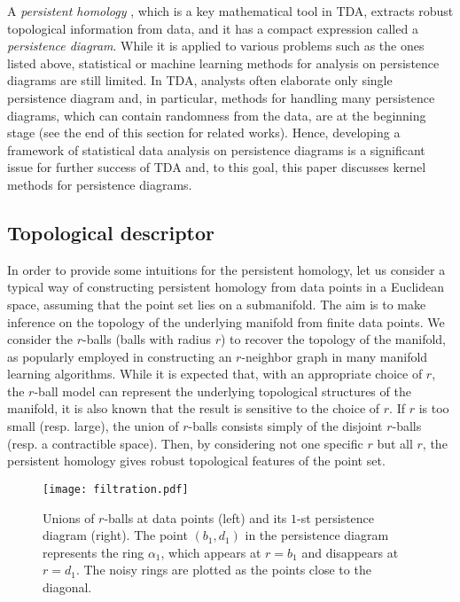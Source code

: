 \documentclass{article}
\begin{document}
A {\em persistent homology} \cite{ELZ02}, which is a key mathematical tool in TDA, extracts robust topological information from data, and it has a compact expression called a {\em persistence diagram}.
While it is applied to various problems such as the ones listed above, statistical or machine learning methods for analysis on persistence diagrams are still limited.
In TDA, analysts often elaborate only single persistence diagram and, in particular, methods for handling many persistence diagrams, which can contain randomness from the data, are at the beginning stage (see the end of this section for related works).
Hence, developing a framework of statistical data analysis on persistence diagrams is a significant issue for further success of TDA and, to this goal, this paper discusses kernel methods for persistence diagrams.

\subsection{Topological descriptor}
\label{subsec:persistent_homology}

In order to provide some intuitions for the persistent homology, let us consider a typical way of constructing persistent homology from data points in a Euclidean space, assuming that the point set lies on a submanifold.
The aim is to make inference on the topology of the underlying manifold from finite data points.
We consider the $r$-balls (balls with radius $r$) to recover the topology of the manifold, as popularly employed in constructing an $r$-neighbor graph in many manifold learning algorithms.
While it is expected that, with an appropriate choice of $r$, the $r$-ball model can represent the underlying topological structures of the manifold, it is also known that the result is sensitive to the choice of $r$.
If $r$ is too small (resp. large), the union of $r$-balls consists simply of the disjoint $r$-balls (resp. a contractible space).
Then, by considering not one specific $r$ but all $r$, the persistent homology gives robust topological features of the point set.
\begin{figure}[htbp]
\begin{center}
\texttt{[image: filtration.pdf]}
\caption{Unions of $r$-balls at data points (left) and its $1$-st persistence diagram (right). The point $(b_{1},d_{1})$ in the persistence diagram represents the ring $\alpha_{1}$, which appears at $r=b_1$ and disappears at $r=d_1$. The noisy rings are plotted as the points close to the diagonal.}
\label{fig:filtration}
\end{center}
\end{figure}
\end{document}
